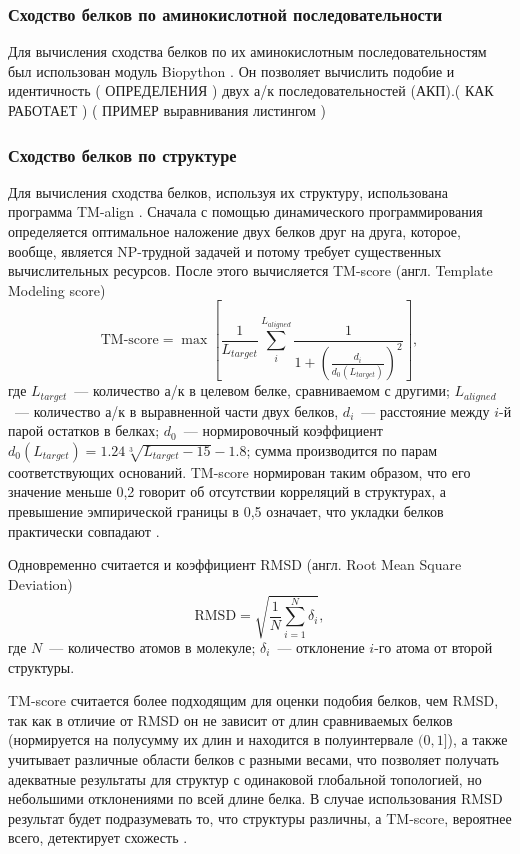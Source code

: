 \documentclass[a4paper,14pt]{article}         %
\begin{document}
\subsubsection{Сходство белков по аминокислотной последовательности}
Для вычисления сходства белков по их аминокислотным последовательностям был использован модуль Biopython \cite{biopython}. Он позволяет вычислить подобие и идентичность (\color{orange} ОПРЕДЕЛЕНИЯ \color{black}) двух а/к последовательностей (АКП).(\color{orange} КАК РАБОТАЕТ \color{black}) (\color{orange} ПРИМЕР выравнивания листингом \color{black}) 

\subsubsection{Сходство белков по структуре}
Для вычисления сходства белков, используя их структуру, использована программа TM-align \cite{TM, TMalign}. 
Сначала с помощью динамического программирования определяется оптимальное наложение двух белков друг на друга, которое, вообще, является NP-трудной задачей \cite{Lathrop1994} 
и потому требует существенных вычислительных ресурсов. После этого вычисляется TM-score (англ. Template Modeling score)\cite{Levitt1998} 
\begin{equation}
\label{tm-score}
\text{TM-score} = \max\left[\frac{1}{L_{target}}\sum_i^{L_{aligned}}\frac{1}{1+\left(\frac{d_i}{d_0(L_{target})}\right)^2}\right],
\end{equation}
где $L_{target}$~--- количество а/к в целевом белке, сравниваемом с другими; $L_{aligned}$~--- количество а/к в выравненной части двух белков, $d_i$~--- расстояние между $i$-й парой остатков в белках; $d_0$~--- нормировочный коэффициент $d_0(L_{target}) = 1.24\sqrt[3]{L_{target}-15}-1.8$; сумма производится по парам соответствующих оснований. TM-score нормирован таким образом, что его значение меньше 0,2 говорит об отсутствии корреляций в структурах, а превышение эмпирической границы в 0,5 означает, что укладки белков практически совпадают \cite{TMalign}. 

Одновременно считается и коэффициент RMSD (англ. Root Mean Square Deviation) %
\begin{equation}
\label{rmsd}
\text{RMSD} = \sqrt{\frac{1}{N}\sum_{i=1}^N \delta_i},
\end{equation}
где $N$~--- количество атомов в молекуле; $\delta_i$~--- отклонение $i$-го атома от второй структуры.

TM-score считается более подходящим для оценки подобия белков, чем RMSD, так как в отличие от RMSD он не зависит от длин сравниваемых белков (нормируется на полусумму их длин и находится в полуинтервале $(0, 1]$), а также учитывает различные области белков с разными весами, что позволяет получать адекватные результаты для структур с одинаковой глобальной топологией, но небольшими отклонениями по всей длине белка. В случае использования RMSD результат будет подразумевать то, что структуры различны, а TM-score, вероятнее всего, детектирует схожесть \cite{TMalign}.
\end{document}
